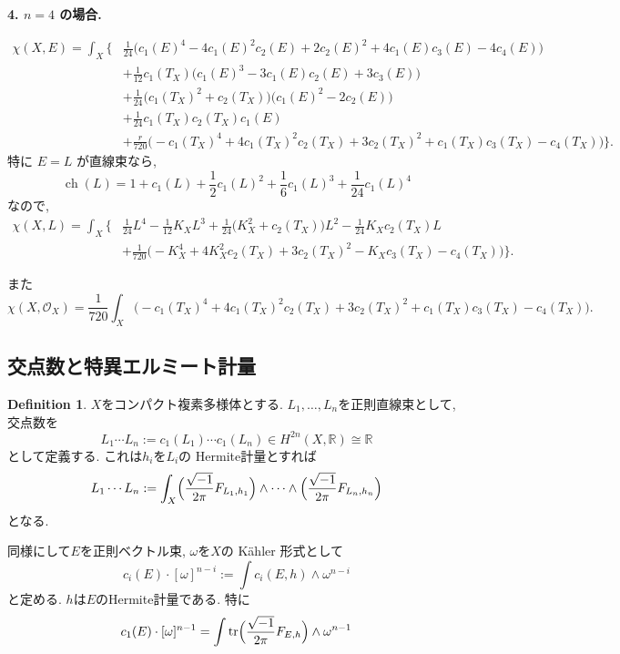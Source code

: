 \documentclass[dvipdfmx,a4paper,11pt]{article} %
\theoremstyle{definition}
\newtheorem{defn}[thm]{Definition}
\theoremstyle{remark}
\numberwithin{equation}{section}
\newcommand{\R}{\mathbb{R}}
\begin{document}
\medskip

\noindent
\textbf{4. \(n=4\) の場合.}

\[
\begin{aligned}
\chi(X,E)
=
\int_X
\Bigg\{
&
\frac{1}{24}
\bigl(
c_1(E)^4
-4c_1(E)^2c_2(E)
+2c_2(E)^2
+4c_1(E)c_3(E)
-4c_4(E)
\bigr)
\\
&+
\frac{1}{12}c_1(T_X)
\bigl(
c_1(E)^3
-3c_1(E)c_2(E)
+3c_3(E)
\bigr)
\\
&+
\frac{1}{24}
\bigl(
c_1(T_X)^2+c_2(T_X)
\bigr)
\bigl(
c_1(E)^2-2c_2(E)
\bigr)
\\
&+
\frac{1}{24}
c_1(T_X)c_2(T_X)c_1(E)
\\
&+
\frac{r}{720}
\bigl(
-c_1(T_X)^4
+4c_1(T_X)^2c_2(T_X)
+3c_2(T_X)^2
+c_1(T_X)c_3(T_X)
-c_4(T_X)
\bigr)
\Bigg\}.
\end{aligned}
\]
特に \(E=L\) が直線束なら,
\[
\operatorname{ch}(L)
=
1
+
c_1(L)
+
\frac{1}{2}c_1(L)^2
+
\frac{1}{6}c_1(L)^3
+
\frac{1}{24}c_1(L)^4
\]
なので,
\[
\begin{aligned}
\chi(X,L)
=
\int_X
\Bigg\{
&
\frac{1}{24}L^4
-
\frac{1}{12}K_XL^3
+
\frac{1}{24}
\bigl(
K_X^2+c_2(T_X)
\bigr)L^2
-
\frac{1}{24}
K_Xc_2(T_X)L
\\
&+
\frac{1}{720}
\bigl(
-K_X^4
+4K_X^2c_2(T_X)
+3c_2(T_X)^2
-K_Xc_3(T_X)
-c_4(T_X)
\bigr)
\Bigg\}.
\end{aligned}
\]

また
\[
\chi(X,\mathcal O_X)
=
\frac{1}{720}
\int_X
\bigl(
-c_1(T_X)^4
+4c_1(T_X)^2c_2(T_X)
+3c_2(T_X)^2
+c_1(T_X)c_3(T_X)
-c_4(T_X)
\bigr).
\]

\subsection{交点数と特異エルミート計量}

\begin{defn}
$X$をコンパクト複素多様体とする. 
$L_1, \ldots, L_n$を正則直線束として, 交点数を
$$
L_1\cdots L_{n}
:= c_1(L_1) \cdots c_1(L_n) \in H^{2n}(X, \R) \cong \R
$$
として定義する. 
これは$h_i$を$L_i$の Hermite計量とすれば
$$
L_1\cdots L_{n}
:=
\int_{X}
 \Bigl(\frac{\sqrt{-1}}{2\pi}F_{L_1,h_1}\Bigr)
\wedge \cdots \wedge 
 \Bigl(\frac{\sqrt{-1}}{2\pi}F_{L_n,h_n}\Bigr)
$$
となる. 

同様にして$E$を正則ベクトル束, $\omega$を$X$の Kähler 形式として
$$
c_i(E) \cdot [\omega]^{n-i}
:=\int c_i(E,h)\wedge \omega^{n-i}
$$
と定める. $h$は$E$のHermite計量である.
特に
$$
c_1(E) \cdot [\omega]^{n-1}
=\int 
\mathrm{tr} \Bigl(\frac{\sqrt{-1}}{2\pi}F_{E,h}\Bigr) \wedge \omega^{n-1}
$$
\end{defn}
\end{document}
